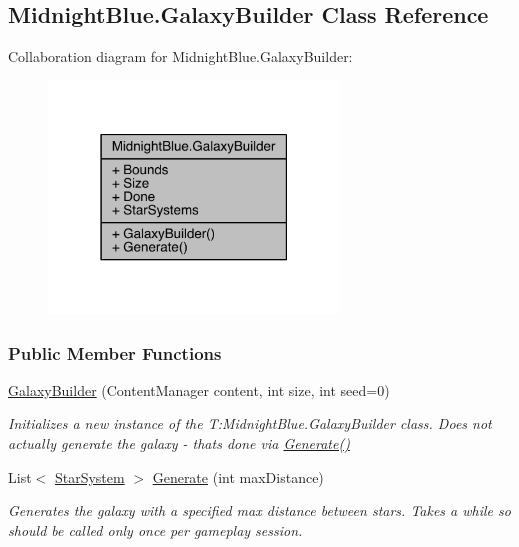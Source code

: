 \hypertarget{class_midnight_blue_1_1_galaxy_builder}{}\subsection{Midnight\+Blue.\+Galaxy\+Builder Class Reference}
\label{class_midnight_blue_1_1_galaxy_builder}


Collaboration diagram for Midnight\+Blue.\+Galaxy\+Builder\+:\nopagebreak
\begin{figure}[H]
\begin{center}
\leavevmode
\includegraphics[width=219pt]{class_midnight_blue_1_1_galaxy_builder__coll__graph}
\end{center}
\end{figure}
\subsubsection*{Public Member Functions}
\begin{DoxyCompactItemize}
\item 
\hyperlink{class_midnight_blue_1_1_galaxy_builder_a926e49d9c54675035304d7506c02a0b9}{Galaxy\+Builder} (Content\+Manager content, int size, int seed=0)
\begin{DoxyCompactList}\small\item\em Initializes a new instance of the T\+:\+Midnight\+Blue.\+Galaxy\+Builder class. Does not actually generate the galaxy -\/ that\textquotesingle{}s done via \hyperlink{class_midnight_blue_1_1_galaxy_builder_aaa080e0108cf02709137b7eebb56ad1a}{Generate()} \end{DoxyCompactList}\item 
List$<$ \hyperlink{class_midnight_blue_1_1_star_system}{Star\+System} $>$ \hyperlink{class_midnight_blue_1_1_galaxy_builder_aaa080e0108cf02709137b7eebb56ad1a}{Generate} (int max\+Distance)
\begin{DoxyCompactList}\small\item\em Generates the galaxy with a specified max distance between stars. Takes a while so should be called only once per gameplay session. \end{DoxyCompactList}\end{DoxyCompactItemize}
